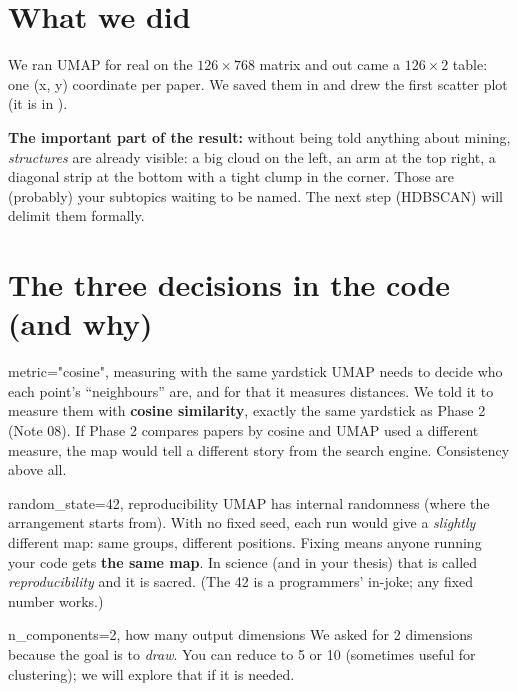 \documentclass[11pt,a4paper]{article}
\begin{document}
\section{What we did}

We ran UMAP for real on the $126 \times 768$ matrix and out came a $126 \times 2$ table: one
(x, y) coordinate per paper. We saved them in  and
drew the first scatter plot (it is in ).

\textbf{The important part of the result:} without being told anything about mining,
\emph{structures} are already visible: a big cloud on the left, an arm at the top right, a
diagonal strip at the bottom with a tight clump in the corner. Those are (probably) your
subtopics waiting to be named. The next step (HDBSCAN) will delimit them formally.

\section{The three decisions in the code (and why)}

\begin{concepto}{metric="cosine", measuring with the same yardstick}
UMAP needs to decide who each point's ``neighbours'' are, and for that it measures distances.
We told it to measure them with \textbf{cosine similarity}, exactly the same yardstick as
Phase 2 (Note 08). If Phase 2 compares papers by cosine and UMAP used a different measure, the
map would tell a different story from the search engine. Consistency above all.
\end{concepto}

\begin{concepto}{random\_state=42, reproducibility}
UMAP has internal randomness (where the arrangement starts from). With no fixed seed, each run
would give a \emph{slightly} different map: same groups, different positions. Fixing
 means anyone running your code gets \textbf{the same map}. In
science (and in your thesis) that is called \emph{reproducibility} and it is sacred.
(The 42 is a programmers' in-joke; any fixed number works.)
\end{concepto}

\begin{concepto}{n\_components=2, how many output dimensions}
We asked for 2 dimensions because the goal is to \emph{draw}. You can reduce to 5 or 10
(sometimes useful for clustering); we will explore that if it is needed.
\end{concepto}
\end{document}
